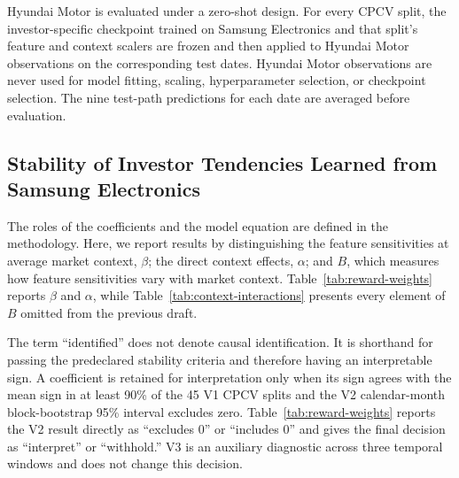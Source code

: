 \documentclass[sigconf,anonymous,review]{acmart}
\begin{document}
Hyundai Motor is evaluated under a zero-shot design. For every CPCV split, the investor-specific checkpoint trained on Samsung Electronics and that split's feature and context scalers are frozen and then applied to Hyundai Motor observations on the corresponding test dates. Hyundai Motor observations are never used for model fitting, scaling, hyperparameter selection, or checkpoint selection. The nine test-path predictions for each date are averaged before evaluation.

\subsection{Stability of Investor Tendencies Learned from Samsung Electronics}
\label{sec:stability-results}

The roles of the coefficients and the model equation are defined in the methodology. Here, we report results by distinguishing the feature sensitivities at average market context, $\beta$; the direct context effects, $\alpha$; and $B$, which measures how feature sensitivities vary with market context. Table~\ref{tab:reward-weights} reports $\beta$ and $\alpha$, while Table~\ref{tab:context-interactions} presents every element of $B$ omitted from the previous draft.

The term ``identified'' does not denote causal identification. It is shorthand for passing the predeclared stability criteria and therefore having an interpretable sign. A coefficient is retained for interpretation only when its sign agrees with the mean sign in at least 90\% of the 45 V1 CPCV splits and the V2 calendar-month block-bootstrap 95\% interval excludes zero. Table~\ref{tab:reward-weights} reports the V2 result directly as ``excludes 0'' or ``includes 0'' and gives the final decision as ``interpret'' or ``withhold.'' V3 is an auxiliary diagnostic across three temporal windows and does not change this decision.
\end{document}

